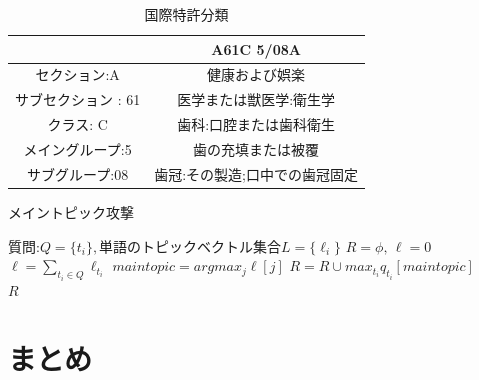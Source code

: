 \documentclass{jsarticle}
\theoremstyle{definition}
\begin{document}
\begin{table}[!hbp]
\center
\begin{tabular}{|c|c|}
\hline
&A61C 5/08A \\
\hline
セクション:A & 健康および娯楽 \\
サブセクション : 61 & 医学または獣医学:衛生学 \\
クラス: C & 歯科:口腔または歯科衛生 \\
メイングループ:5 & 歯の充填または被覆 \\
サブグループ:08 & 歯冠:その製造;口中での歯冠固定 \\
\hline
\end{tabular}
\caption{国際特許分類}\label{tab:class}
\end{table}

\begin{algorithm}
\caption{メイントピック攻撃}
\begin{algorithmic}[1]
	\Require 質問:$Q=\{t_i\},$単語のトピックベクトル集合$L=\{\ell_i\}$
	\State $R=\phi, \, \ell=0$
	\State $\ell=\sum_{t_i \in Q}\ell_{t_i}$
	\State $maintopic=argmax_j \ell[j]$
	\State $R=R \cup max_{t_i}q_{t_i}[maintopic]$
	\EndFor　\\ 
	\Return $R$
\end{algorithmic}
\end{algorithm}

\section{まとめ}




\end{document}
